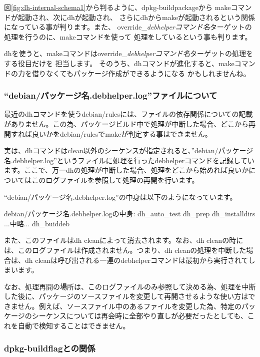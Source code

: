 \documentclass[mingoth,a4paper]{jsarticle}
\begin{document}
図\ref{fig:dh-internal-schema1}から判るように、dpkg-buildpackageから
makeコマンドが起動され、次にdhが起動され、
さらにdhからmakeが起動されるという関係になっている事が判ります。また、
override\_{\em debhelperコマンド名}ターゲットの処理を行うのに、makeコマンドを使って
処理をしているという事も判ります。

dhを使うと、makeコマンドはoverride\_{\em debhelperコマンド名}ターゲットの処理をする役目だけを
担当します。
そのうち、dhコマンドが進化すると、makeコマンドの力を借りなくてもパッケージ作成ができるようになる
かもしれませんね。

\subsubsection{``debian/パッケージ名.debhelper.log''ファイルについて}

最近のdhコマンドを使うdebian/rulesには、ファイルの依存関係についての記載がありません。この為、パッケージビルド中で処理が中断した場合、どこから再開すれば良いかをdebian/rulesでmakeが判定する事はできません。

実は、dhコマンドはclean以外のシーケンスが指定されると、''debian/パッケージ名.debhelper.log''というファイルに処理を行ったdebhelperコマンドを記録しています。ここで、万一dhの処理が中断した場合、処理をどこから始めれば良いかについてはこのログファイルを参照して処理の再開を行います。

``debian/パッケージ名.debhelper.log''の中身は以下のようになっています。

\begin{commandline}
debian/パッケージ名.debhelper.logの中身:
dh_auto_test
dh_prep
dh_installdirs
...中略...
dh_buiddeb
\end{commandline}

また、このファイルはdh cleanによって消去されます。なお、dh cleanの時には、このログファイルは作成されません。つまり、dh cleanの処理を中断した場合は、dh cleanは呼び出される一連のdebhelperコマンドは最初から実行されてしまいます。

なお、処理再開の場所は、このログファイルのみ参照して決める為、処理を中断した後に、パッケージのソースファイルを変更して再開させるような使い方はできません。例えば、ソースファイル中のあるファイルを変更した為、特定のパッケージのシーケンスについては再会時に全部やり直しが必要だったとしても、これを自動で検知することはできません。

\subsubsection{dpkg-buildflagとの関係}
\end{document}
